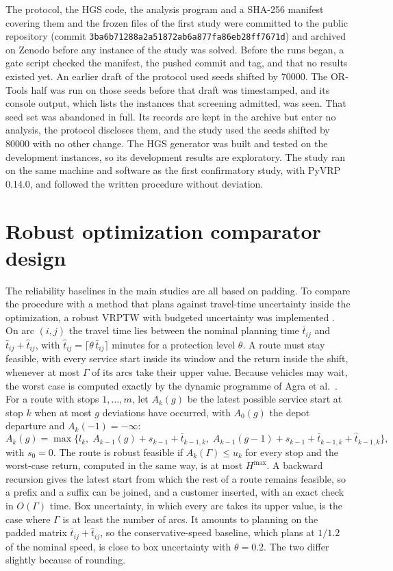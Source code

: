 \documentclass[11pt,a4paper]{article}
\begin{document}
The protocol, the HGS code, the analysis program and a SHA-256 manifest covering
them and the frozen files of the first study were committed to the public
repository (commit \texttt{3ba6b71288a2a51872ab6a877fa86eb28ff7671d}) and archived
on Zenodo \cite{ali2026freeze2} before any instance of the study was solved.
Before the runs began, a gate script checked the manifest, the pushed commit and
tag, and that no results existed yet. An earlier draft of the protocol used seeds
shifted by 70000. The OR-Tools half was run on those seeds before that draft was
timestamped, and its console output, which lists the instances that screening
admitted, was seen. That seed set was abandoned in full. Its records are kept in
the archive but enter no analysis, the protocol discloses them, and the study used
the seeds shifted by 80000 with no other change. The HGS generator was built and
tested on the development instances, so its development results are exploratory.
The study ran on the same machine and software as the first confirmatory study,
with PyVRP 0.14.0, and followed the written procedure without deviation.

\section{Robust optimization comparator design}\label{sec:robust-design}

The reliability baselines in the main studies are all based on padding. To
compare the procedure with a method that plans against travel-time uncertainty
inside the optimization, a robust VRPTW with budgeted uncertainty was implemented
\cite{bertsimas2004,agra2013}. On arc $(i,j)$ the travel time lies between the
nominal planning time $\bar t_{ij}$ and $\bar t_{ij}+\hat t_{ij}$, with
$\hat t_{ij}=\lceil\theta\,\bar t_{ij}\rceil$ minutes for a protection level
$\theta$. A route must stay feasible, with every service start inside its window
and the return inside the shift, whenever at most $\Gamma$ of its arcs take their
upper value. Because vehicles may wait, the worst case is computed exactly by the
dynamic programme of Agra et al.~\cite{agra2013}. For a route with stops
$1,\ldots,m$, let $A_k(g)$ be the latest possible service start at stop $k$ when at
most $g$ deviations have occurred, with $A_0(g)$ the depot departure and
$A_{k}(-1)=-\infty$:
\begin{equation}
 A_k(g)=\max\bigl\{l_k,\;A_{k-1}(g)+s_{k-1}+\bar t_{k-1,k},\;
 A_{k-1}(g-1)+s_{k-1}+\bar t_{k-1,k}+\hat t_{k-1,k}\bigr\},
\end{equation}
with $s_0=0$. The route is robust feasible if $A_k(\Gamma)\leq u_k$ for every stop
and the worst-case return, computed in the same way, is at most $H^{\max}$. A
backward recursion gives the latest start from which the rest of a route remains
feasible, so a prefix and a suffix can be joined, and a customer inserted, with an
exact check in $O(\Gamma)$ time. Box uncertainty, in which every arc takes its
upper value, is the case where $\Gamma$ is at least the number of arcs. It amounts
to planning on the padded matrix $\bar t_{ij}+\hat t_{ij}$, so the
conservative-speed baseline, which plans at $1/1.2$ of the nominal speed, is close
to box uncertainty with $\theta=0.2$. The two differ slightly because of rounding.
\end{document}
